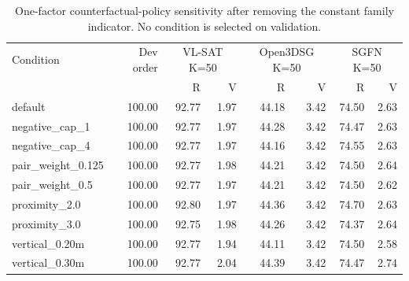 \begin{table}[t]
\centering\scriptsize
\begin{tabular}{@{}lrrrrrrr@{}}
\toprule
Condition & Dev order & \multicolumn{2}{c}{VL-SAT K=50} & \multicolumn{2}{c}{Open3DSG K=50} & \multicolumn{2}{c}{SGFN K=50} \\
& & R & V & R & V & R & V \\
\midrule
default & 100.00 & 92.77 & 1.97 & 44.18 & 3.42 & 74.50 & 2.63 \\
negative\_cap\_1 & 100.00 & 92.77 & 1.97 & 44.28 & 3.42 & 74.47 & 2.63 \\
negative\_cap\_4 & 100.00 & 92.77 & 1.97 & 44.16 & 3.42 & 74.55 & 2.63 \\
pair\_weight\_0.125 & 100.00 & 92.77 & 1.98 & 44.21 & 3.42 & 74.50 & 2.64 \\
pair\_weight\_0.5 & 100.00 & 92.77 & 1.97 & 44.21 & 3.42 & 74.50 & 2.62 \\
proximity\_2.0 & 100.00 & 92.80 & 1.97 & 44.36 & 3.42 & 74.70 & 2.63 \\
proximity\_3.0 & 100.00 & 92.75 & 1.98 & 44.26 & 3.42 & 74.37 & 2.64 \\
vertical\_0.20m & 100.00 & 92.77 & 1.94 & 44.11 & 3.42 & 74.50 & 2.58 \\
vertical\_0.30m & 100.00 & 92.77 & 2.04 & 44.39 & 3.42 & 74.47 & 2.74 \\
\bottomrule
\end{tabular}
\caption{One-factor counterfactual-policy sensitivity after removing the constant family indicator. No condition is selected on validation.}
\label{tab:no-family-counterfactual}
\end{table}

